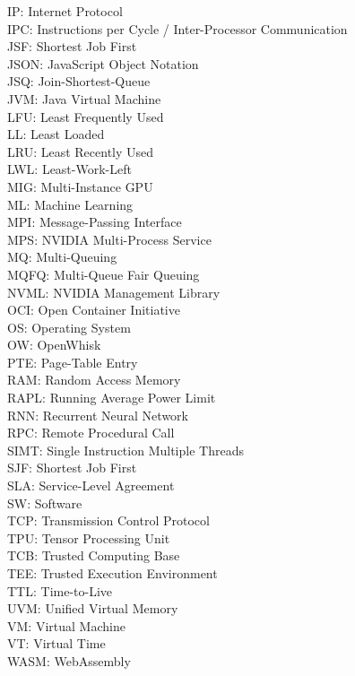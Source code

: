 IP: Internet Protocol \\
IPC: Instructions per Cycle / Inter-Processor Communication \\
JSF: Shortest Job First \\
JSON: JavaScript Object Notation \\
JSQ: Join-Shortest-Queue \\
JVM: Java Virtual Machine \\
LFU: Least Frequently Used \\
LL: Least Loaded \\
LRU: Least Recently Used \\
LWL: Least-Work-Left \\
MIG: Multi-Instance GPU \\
ML: Machine Learning \\
MPI: Message-Passing Interface \\
MPS: NVIDIA Multi-Process Service \\
MQ: Multi-Queuing \\
MQFQ: Multi-Queue Fair Queuing \\
NVML: NVIDIA Management Library \\
OCI: Open Container Initiative \\
OS: Operating System \\
OW: OpenWhisk \\
PTE: Page-Table Entry \\
RAM: Random Access Memory \\
RAPL: Running Average Power Limit \\
RNN: Recurrent Neural Network \\
RPC: Remote Procedural Call \\
SIMT: Single Instruction Multiple Threads \\
SJF: Shortest Job First \\
SLA: Service-Level Agreement \\
SW: Software \\
TCP: Transmission Control Protocol \\
TPU: Tensor Processing Unit \\
TCB: Trusted Computing Base \\
TEE: Trusted Execution Environment \\
TTL: Time-to-Live \\
UVM: Unified Virtual Memory \\
VM: Virtual Machine \\
VT: Virtual Time \\
WASM: WebAssembly \\

